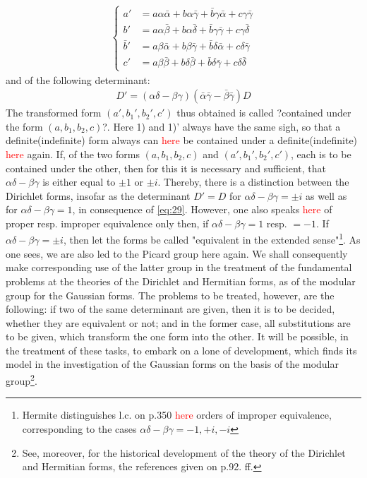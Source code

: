 \begin{align} \label{eq:28}
\left\{\begin{array}{rcl}
a' &= a\alpha\bar{\alpha} + b\alpha\bar{\gamma} + \bar{b}\gamma\bar{\alpha} + c\gamma\bar{\gamma}\\
b' &= a\alpha\bar{\beta}  + b\alpha\bar{\delta} + \bar{b}\gamma\bar{\gamma} + c\gamma\bar{\delta}\\
\bar{b}' &= a\beta\bar{\alpha}  + b\beta\bar{\gamma} + \bar{b}\delta\bar{\alpha} + c\delta\bar{\gamma}\\
c' &= a\beta\bar{\beta}  + b\delta\bar{\beta} + \bar{b}\delta\bar{\gamma} + c\delta\bar{\delta}
\end{array}\right.
\end{align}
and of the following determinant:
\begin{align} \label{eq:29}
D' = (\alpha\delta-\beta\gamma)(\bar{\alpha}\bar{\gamma}-\bar{\beta}\bar{\gamma})D
\end{align}
The transformed form $(a',b_{1}',b_{2}',c')$ thus obtained is called ?contained under the form $(a,b_1,b_2,c)$?.
Here 1) and 1)' always have the same sigh, so that a definite(indefinite) form always can \textcolor{red}{here} be contained under a definite(indefinite) \textcolor{red}{here} again.
If, of the two forms $(a,b_{1},b_{2},c)$ and $(a',b_1',b_2',c')$, each is to be contained under the other, then for this it is necessary and sufficient, that $\alpha\delta-\beta\gamma$ is either equal to $\pm 1$ or $\pm i$. Thereby, there is a distinction between the Dirichlet forms, insofar as the determinant $D'=D$ for $\alpha\delta-\beta\gamma= \pm i$ as well as for $\alpha\delta-\beta\gamma = 1$, in consequence of \ref{eq:29}. However, one also speaks \textcolor{red}{here} of proper resp. improper equivalence only then, if $\alpha\delta-\beta\gamma = 1$ resp. $=-1$. If $\alpha\delta-\beta\gamma = \pm i$, then let the forms be called "equivalent in the extended sense"\footnote{Hermite distinguishes l.c. on p.350 \textcolor{red}{here} orders of improper equivalence, corresponding to the cases $\alpha\delta-\beta\gamma = -1, +i, -i$}.
As one sees, we are also led to the Picard group here again. We shall consequently make corresponding use of the latter group in the treatment of the fundamental problems at the theories of the Dirichlet and Hermitian forms, as of the modular group for the Gaussian forms. The problems to be treated, however, are the following: if two of the same determinant are given, then it is to be decided, whether they are equivalent or not; and in the former case, all substitutions are to be given, which transform the one form into the other. It will be possible, in the treatment of these tasks, to embark on a lone of development, which finds its model in the investigation of the Gaussian forms on the basis of the modular group\footnote{See, moreover, for the historical development of the theory of the Dirichlet and Hermitian forms, the references given on p.92. ff.}.